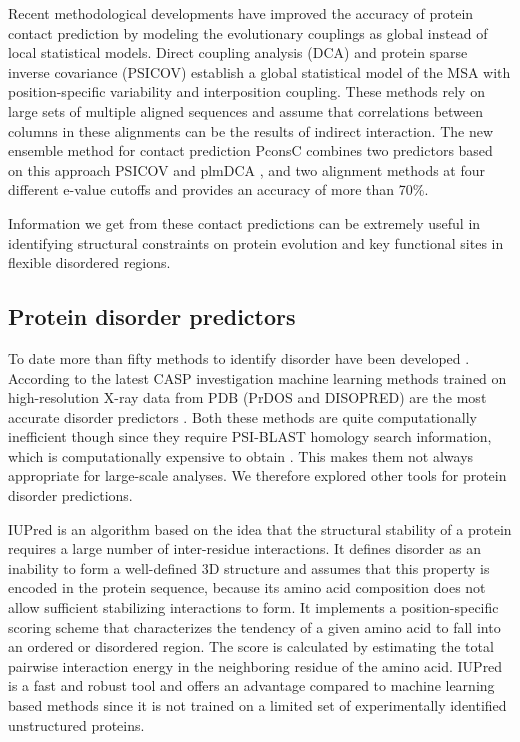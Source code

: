 \documentclass[11pt, a4paper,oneside]{report}
\begin{document}
 Recent methodological developments have improved the accuracy of protein contact prediction by modeling the evolutionary couplings as global instead of local statistical models.  Direct coupling analysis (DCA) \cite{Morcos2011} and protein sparse inverse covariance (PSICOV) \cite{Jones2012} establish a global statistical model of the MSA with position-specific variability and interposition coupling. These methods rely on large sets of multiple aligned sequences and assume that correlations between columns in these alignments can be the results of indirect interaction. The new ensemble method for contact prediction PconsC \cite{Skwark2013} combines two predictors based on this approach PSICOV and plmDCA \cite{Ekeberg2013}, and two alignment methods at four different e-value cutoffs and provides an accuracy of more than 70\%. 
 
Information we get from these contact predictions can be extremely useful in identifying structural constraints on protein evolution and key functional sites in flexible disordered regions.

\subsection{Protein disorder predictors}
To date more than fifty methods to identify disorder have been developed \cite{He2009}.  
According to the latest CASP investigation machine learning methods trained on high-resolution X-ray data from PDB (PrDOS and DISOPRED) are the most accurate disorder predictors \cite{Monastyrskyy2011}. Both these methods are quite computationally inefficient though since they require PSI-BLAST homology search information, which is computationally expensive to obtain \cite{Ward2004}. This makes them not always appropriate for large-scale analyses.  We therefore explored other tools for protein disorder predictions. 

  IUPred \cite{Dosztanyi2005} is an algorithm based on the idea that the structural stability of a protein requires a large number of inter-residue interactions. It defines disorder as an inability to form a well-defined 3D structure and assumes that this property is encoded in the protein sequence, because its amino acid composition does not allow sufficient stabilizing interactions to form. 
It implements a position-specific scoring scheme that characterizes the tendency of a given amino acid to fall into an ordered or disordered region. The score is calculated by estimating the total pairwise interaction energy in the neighboring residue of the amino acid. IUPred is a fast and robust tool and offers an advantage compared to machine learning based methods since it is not trained on a limited set of experimentally identified unstructured proteins.  
\end{document}

